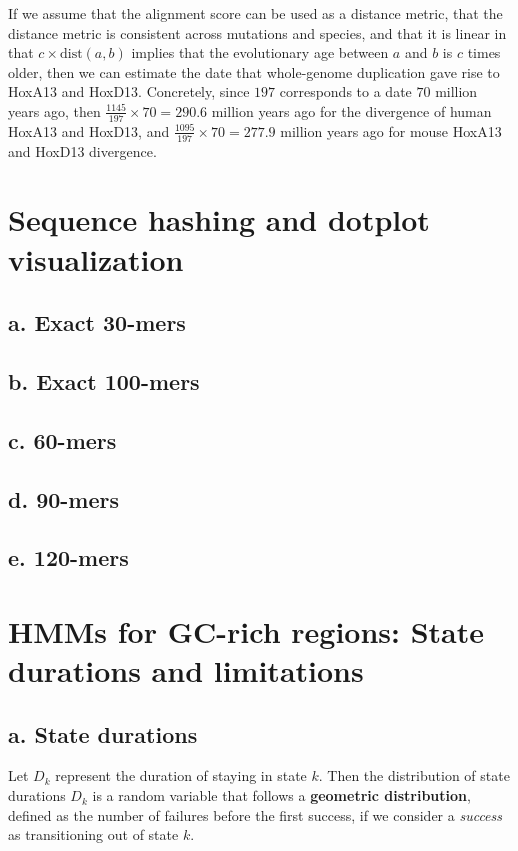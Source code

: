 \documentclass[a4paper]{article}
\begin{document}
If we assume that the alignment score can be used as a distance metric,
that the distance metric is consistent across mutations and species,
and that it is linear in that $c \times \text{dist}(a, b)$ implies that
the evolutionary age between $a$ and $b$ is $c$ times older, then
we can estimate the date that whole-genome duplication gave rise to HoxA13
and HoxD13. Concretely, since $197$ corresponds to a date $70$ million
years ago, then $\frac{1145}{197} \times 70 = 290.6$ million years ago
for the divergence of human HoxA13 and HoxD13, and
$\frac{1095}{197} \times 70 = 277.9$ million years ago for
mouse HoxA13 and HoxD13 divergence.

\section{Sequence hashing and dotplot visualization}

\subsection*{a. Exact 30-mers}
\subsection*{b. Exact 100-mers}
\subsection*{c. 60-mers}
\subsection*{d. 90-mers}
\subsection*{e. 120-mers}

\section{HMMs for GC-rich regions: State durations and limitations}

\subsection*{a. State durations}
Let $D_k$ represent the duration of staying in state $k$. Then the
distribution of state durations $D_k$ is a random variable that follows a
{\bf geometric distribution}, defined as the number of failures
before the first success, if we consider a {\it success} as transitioning out of 
state $k$.
\end{document}
